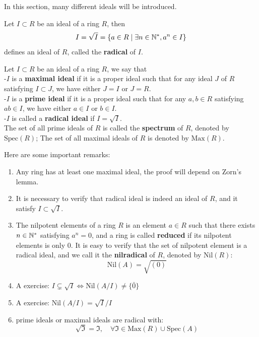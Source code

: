In this section, many different ideals will be introduced.
\begin{lemma}
    Let \(I \subset R\) be an ideal of a ring \(R\), then 
    \[I = \sqrt{I} = \{a \in R \mid \exists n \in \mathbb{N}^*, a^n \in I\}\]
    defines an ideal of \(R\), called the \textbf{radical} of \(I\).
\end{lemma}

\begin{definition}
    Let \(I \subset R\) be an ideal of a ring \(R\), we say that\\

    -\(I\) is a \textbf{maximal ideal} if it is a proper ideal such that for any ideal \(J\) of \(R\) satisfying \(I \subset J \), we have either \(J = I\) or \(J = R\).\\

    -\(I\) is a \textbf{prime ideal} if it is a proper ideal such that for any \(a,b \in R\) satisfying \(ab \in I\), we have either \(a \in I\) or \(b \in I\).\\

    -\(I\) is called a \textbf{radical ideal} if \(I = \sqrt{I}\).\\

    The set of all prime ideals of \(R\) is called the \textbf{spectrum} of \(R\), denoted by \(\mathrm{Spec}(R)\); The set of all maximal ideals of \(R\) is denoted by \(\mathrm{Max}(R)\).
\end{definition}

Here are some important remarks:
\begin{enumerate}
    \item Any ring has at least one maximal ideal, the proof will depend on 
    Zorn's lemma.

    \item It is necessary to verify that radical ideal is indeed an ideal of \(R\), and it satisfy \(I \subset \sqrt{I}\).

    \item The nilpotent elements of a ring \(R\) is an element \(a \in R\) such that there exists \(n \in \mathbb{N}^*\) satisfying \(a^n = 0\), and a ring is called \textbf{reduced} if its nilpotent elements is only \(0\). It is easy to verify that the set of nilpotent element is a radical ideal, and we call it the \textbf{nilradical} of \(R\), denoted by \(\mathrm{Nil}(R)\):
    \[\mathrm{Nil}(A) = \sqrt{(0)}\]

    \item A exercise: \(I \subsetneq \sqrt{I} \iff \mathrm{Nil}(A/I) \neq \{\bar{0}\}\)

    \item A exercise: \(\mathrm{Nil}(A/I) = \sqrt{I}/I\)

    \item prime ideals or maximal ideals are radical with:
    \[\sqrt{\mathfrak{I}} = \mathfrak{I}, \quad \forall \mathfrak{I} \in \mathrm{Max}(R) \cup \mathrm{Spec}(A)\]
\end{enumerate}

